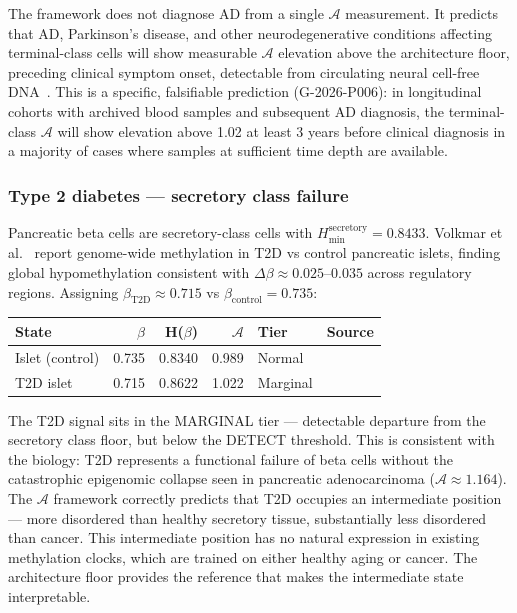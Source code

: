 \documentclass[12pt,a4paper]{article}
\newcommand{\Hmin}{H_{\min}}
\newcommand{\Ascore}{\mathcal{A}}
\begin{document}
The framework does not diagnose AD from a single $\Ascore$ measurement.
It predicts that AD, Parkinson's disease, and other neurodegenerative conditions
affecting terminal-class cells will show measurable $\Ascore$ elevation above
the architecture floor, preceding clinical symptom onset, detectable from
circulating neural cell-free DNA~\cite{Grail2021}. This is a specific,
falsifiable prediction (G-2026-P006): in longitudinal cohorts with archived
blood samples and subsequent AD diagnosis, the terminal-class $\Ascore$ will
show elevation above 1.02 at least 3 years before clinical diagnosis in a
majority of cases where samples at sufficient time depth are available.

\subsubsection{Type 2 diabetes --- secretory class failure}

Pancreatic beta cells are secretory-class cells with $\Hmin^{\mathrm{secretory}}
= 0.8433$. Volkmar et al.~\cite{Volkmar2012} report genome-wide methylation in
T2D vs control pancreatic islets, finding global hypomethylation consistent with
$\Delta\beta \approx 0.025$--$0.035$ across regulatory regions. Assigning
$\beta_{\mathrm{T2D}} \approx 0.715$ vs $\beta_{\mathrm{control}} = 0.735$:

\begin{center}
{\small\begin{tabular}{@{}p{3.6cm}rrrp{1.9cm}p{2.5cm}@{}}
\toprule
\textbf{State} & \textbf{$\beta$} & \textbf{H($\beta$)} &
\textbf{$\Ascore$} & \textbf{Tier} & \textbf{Source} \\
\midrule
Islet (control)            & 0.735 & 0.8340 & 0.989 & Normal &
  \cite{Roadmap2015} \\
T2D islet                  & 0.715 & 0.8622 & 1.022 & Marginal &
  \cite{Volkmar2012} \\
\bottomrule
\end{tabular}}
\end{center}

The T2D signal sits in the MARGINAL tier --- detectable departure from the
secretory class floor, but below the DETECT threshold. This is consistent with
the biology: T2D represents a functional failure of beta cells without the
catastrophic epigenomic collapse seen in pancreatic adenocarcinoma ($\Ascore
\approx 1.164$). The $\Ascore$ framework correctly predicts that T2D occupies
an intermediate position --- more disordered than healthy secretory tissue,
substantially less disordered than cancer. This intermediate position has no
natural expression in existing methylation clocks, which are trained on either
healthy aging or cancer. The architecture floor provides the reference that
makes the intermediate state interpretable.
\end{document}
